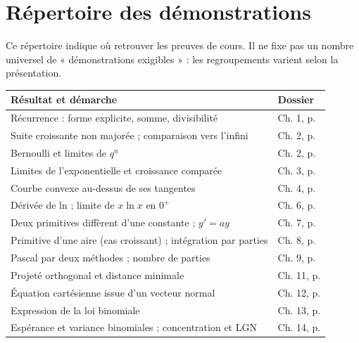 \chapter{Répertoire des démonstrations}
Ce répertoire indique où retrouver les preuves de cours. Il ne fixe pas un nombre universel de « démonstrations exigibles » : les regroupements varient selon la présentation.
\begin{longtable}{@{}p{}p{}@{}}\toprule\textbf{Résultat et démarche}&\textbf{Dossier}\\\midrule\endhead
Récurrence : forme explicite, somme, divisibilité&Ch. 1, p. \pageref{ch:1}\\
Suite croissante non majorée ; comparaison vers l'infini&Ch. 2, p. \pageref{ch:2}\\
Bernoulli et limites de $q^n$&Ch. 2, p. \pageref{ch:2}\\
Limites de l'exponentielle et croissance comparée&Ch. 3, p. \pageref{ch:3}\\
Courbe convexe au-dessus de ses tangentes&Ch. 4, p. \pageref{ch:4}\\
Dérivée de ln ; limite de $x\ln x$ en $0^+$&Ch. 6, p. \pageref{ch:6}\\
Deux primitives diffèrent d'une constante ; $y'=ay$&Ch. 7, p. \pageref{ch:7}\\
Primitive d'une aire (cas croissant) ; intégration par parties&Ch. 8, p. \pageref{ch:8}\\
Pascal par deux méthodes ; nombre de parties&Ch. 9, p. \pageref{ch:9}\\
Projeté orthogonal et distance minimale&Ch. 11, p. \pageref{ch:11}\\
Équation cartésienne issue d'un vecteur normal&Ch. 12, p. \pageref{ch:12}\\
Expression de la loi binomiale&Ch. 13, p. \pageref{ch:13}\\
Espérance et variance binomiales ; concentration et LGN&Ch. 14, p. \pageref{ch:14}\\\bottomrule\end{longtable}
